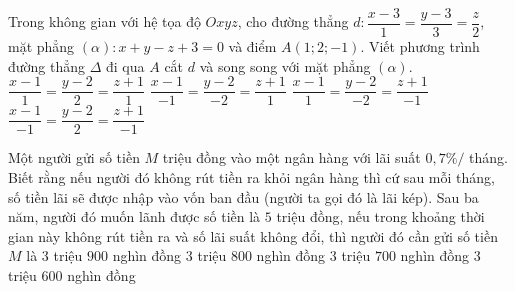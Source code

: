 \begin{ex}%
Trong không gian với hệ tọa độ $Oxyz$, cho đường thẳng $d\colon \dfrac{x - 3}{1} = \dfrac{y - 3}{3} = \dfrac{z}{2}$, mặt phẳng $\left(\alpha\right)\colon x + y - z + 3 = 0$ và điểm $A\left(1;2;-1\right)$. Viết phương trình đường thẳng $\Delta$ đi qua $A$ cắt $d$ và song song với mặt phẳng $\left(\alpha\right)$.
\choice
{$\dfrac{x - 1}{1} = \dfrac{y - 2}{2} = \dfrac{z + 1}{1}$}
{$\dfrac{x - 1}{- 1} = \dfrac{y - 2}{- 2} = \dfrac{z + 1}{1}$}
{\True $\dfrac{x - 1}{1} = \dfrac{y - 2}{- 2} = \dfrac{z + 1}{- 1}$}
{$\dfrac{x - 1}{- 1} = \dfrac{y - 2}{2} = \dfrac{z + 1}{- 1}$}
\end{ex}
\begin{ex}%
Một người gửi số tiền $M$ triệu đồng vào một ngân hàng với lãi suất $0{,}7\%/$ tháng. Biết rằng nếu người đó không rút tiền ra khỏi ngân hàng thì cứ sau mỗi tháng, số tiền lãi sẽ được nhập vào vốn ban đầu (người ta gọi đó là lãi kép). Sau ba năm, người đó muốn lãnh được số tiền là $5$ triệu đồng, nếu trong khoảng thời gian này không rút tiền ra và số lãi suất không đổi, thì người đó cần gửi số tiền $M$ là
\choice
{\True $3$ triệu $900$ nghìn đồng}
{$3$ triệu $800$ nghìn đồng}
{$3$ triệu $700$ nghìn đồng}
{$3$ triệu $600$ nghìn đồng}
\end{ex}
